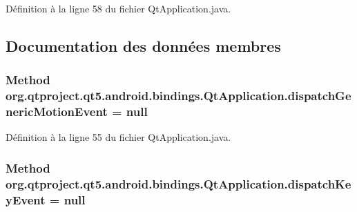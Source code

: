 Définition à la ligne 58 du fichier Qt\-Application.\-java.



\subsection{Documentation des données membres}
\hypertarget{classorg_1_1qtproject_1_1qt5_1_1android_1_1bindings_1_1_qt_application_a2c2d0ff311ded8aaa6dabdde99632a6c}{
\subsubsection[{dispatch\-Generic\-Motion\-Event}]{\setlength{\rightskip}{0pt plus 5cm}Method org.\-qtproject.\-qt5.\-android.\-bindings.\-Qt\-Application.\-dispatch\-Generic\-Motion\-Event = null\hspace{0.3cm}{\ttfamily [static]}}}\label{classorg_1_1qtproject_1_1qt5_1_1android_1_1bindings_1_1_qt_application_a2c2d0ff311ded8aaa6dabdde99632a6c}


Définition à la ligne 55 du fichier Qt\-Application.\-java.

\hypertarget{classorg_1_1qtproject_1_1qt5_1_1android_1_1bindings_1_1_qt_application_a970719713bf7310b041b31dd6415fdcb}{
\subsubsection[{dispatch\-Key\-Event}]{\setlength{\rightskip}{0pt plus 5cm}Method org.\-qtproject.\-qt5.\-android.\-bindings.\-Qt\-Application.\-dispatch\-Key\-Event = null\hspace{0.3cm}{\ttfamily [static]}}}\label{classorg_1_1qtproject_1_1qt5_1_1android_1_1bindings_1_1_qt_application_a970719713bf7310b041b31dd6415fdcb}


